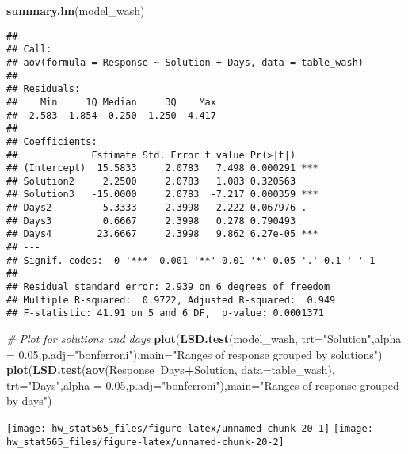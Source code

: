 \documentclass[]{article}
\newenvironment{Shaded}{\begin{snugshade}}{\end{snugshade}}
\newcommand{\CommentTok}[1]{\textcolor[rgb]{0.56,0.35,0.01}{\textit{#1}}}
\newcommand{\DataTypeTok}[1]{\textcolor[rgb]{0.13,0.29,0.53}{#1}}
\newcommand{\FloatTok}[1]{\textcolor[rgb]{0.00,0.00,0.81}{#1}}
\newcommand{\KeywordTok}[1]{\textcolor[rgb]{0.13,0.29,0.53}{\textbf{#1}}}
\newcommand{\NormalTok}[1]{#1}
\newcommand{\OperatorTok}[1]{\textcolor[rgb]{0.81,0.36,0.00}{\textbf{#1}}}
\newcommand{\StringTok}[1]{\textcolor[rgb]{0.31,0.60,0.02}{#1}}
\begin{document}
\begin{Shaded}
\begin{Highlighting}[]
\KeywordTok{summary.lm}\NormalTok{(model_wash)}
\end{Highlighting}
\end{Shaded}

\begin{verbatim}
## 
## Call:
## aov(formula = Response ~ Solution + Days, data = table_wash)
## 
## Residuals:
##    Min     1Q Median     3Q    Max 
## -2.583 -1.854 -0.250  1.250  4.417 
## 
## Coefficients:
##             Estimate Std. Error t value Pr(>|t|)    
## (Intercept)  15.5833     2.0783   7.498 0.000291 ***
## Solution2     2.2500     2.0783   1.083 0.320563    
## Solution3   -15.0000     2.0783  -7.217 0.000359 ***
## Days2         5.3333     2.3998   2.222 0.067976 .  
## Days3         0.6667     2.3998   0.278 0.790493    
## Days4        23.6667     2.3998   9.862 6.27e-05 ***
## ---
## Signif. codes:  0 '***' 0.001 '**' 0.01 '*' 0.05 '.' 0.1 ' ' 1
## 
## Residual standard error: 2.939 on 6 degrees of freedom
## Multiple R-squared:  0.9722, Adjusted R-squared:  0.949 
## F-statistic: 41.91 on 5 and 6 DF,  p-value: 0.0001371
\end{verbatim}

\begin{Shaded}
\begin{Highlighting}[]
\CommentTok{# Plot for solutions and days}
\KeywordTok{plot}\NormalTok{(}\KeywordTok{LSD.test}\NormalTok{(model_wash, }\DataTypeTok{trt=}\StringTok{"Solution"}\NormalTok{,}\DataTypeTok{alpha =} \FloatTok{0.05}\NormalTok{,}\DataTypeTok{p.adj=}\StringTok{"bonferroni"}\NormalTok{),}\DataTypeTok{main=}\StringTok{"Ranges of response grouped by solutions"}\NormalTok{)}
\KeywordTok{plot}\NormalTok{(}\KeywordTok{LSD.test}\NormalTok{(}\KeywordTok{aov}\NormalTok{(Response}\OperatorTok{~}\NormalTok{Days}\OperatorTok{+}\NormalTok{Solution, }\DataTypeTok{data=}\NormalTok{table_wash), }\DataTypeTok{trt=}\StringTok{"Days"}\NormalTok{,}\DataTypeTok{alpha =} \FloatTok{0.05}\NormalTok{,}\DataTypeTok{p.adj=}\StringTok{"bonferroni"}\NormalTok{),}\DataTypeTok{main=}\StringTok{"Ranges of response grouped by days"}\NormalTok{)}
\end{Highlighting}
\end{Shaded}

\texttt{[image: hw\_stat565\_files/figure-latex/unnamed-chunk-20-1]}
\texttt{[image: hw\_stat565\_files/figure-latex/unnamed-chunk-20-2]}
\end{document}
